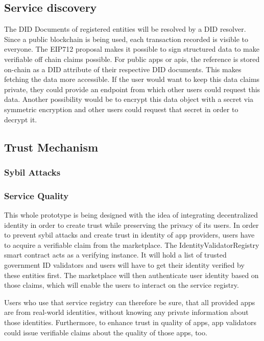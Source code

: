 \subsection{Service discovery}


The DID Documents of registered entities will be resolved by a DID resolver. 
Since a public blockchain is being used, each transaction recorded is visible to everyone. The EIP712 proposal makes it possible to sign structured data to make verifiable off chain claims possible. For public apps or apis, the reference is stored on-chain as a DID attribute of their respective DID documents. This makes fetching the data more accessible. If the user would want to keep this data claims private, they could provide an endpoint from which other users could request this data. Another possibility would be to encrypt this data object with a secret via symmetric encryption and other users could request that secret in order to decrypt it. 



\subsection{Trust Mechanism}

\subsubsection{Sybil Attacks} 


\subsubsection{Service Quality}

This whole prototype is being designed with the idea of integrating decentralized identity in order to create trust while preserving the privacy of its users. In order to prevent sybil attacks and create trust in identity of app providers, users have to acquire a verifiable claim from the marketplace. The IdentityValidatorRegistry smart contract acts as a verifying instance. It will hold a list of trusted government ID validators and users will have to get their identity verified by these entities first. The marketplace will then authenticate user identity based on those claims, which will enable the users to interact on the service registry. 

Users who use that service registry can therefore be sure, that all provided apps are from real-world identities, without knowing any private information about those identities. 
Furthermore, to enhance trust in quality of apps, app validators could issue verifiable claims about the quality of those apps, too. 



